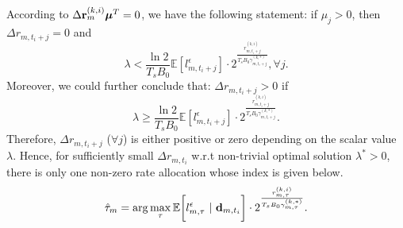 According to $\Delta{{\mathbf{r}}}^{(k,i)}_{m} \boldsymbol{\mu}^T = 0$, we have the following statement:
if $\mu_j > 0$, then $\Delta{r}_{m,t_i+j} = 0$ and
$$
\lambda < \frac{\ln{2}}{T_sB_0} \mathbb{E}[l^{\epsilon}_{m,t_i+j}] \cdot 2^{\frac{r^{(k,i)}_{m,t_i+j}}{T_sB_0 \gamma^{(k,*)}_{m,t_i+j}}}, \forall j.
$$
Moreover, we could further conclude that: $\Delta{r}_{m,t_i+j} > 0$ if
$$
\lambda \geq \frac{\ln{2}}{T_sB_0} \mathbb{E}[l^{\epsilon}_{m,t_i+j}] \cdot 2^{\frac{r^{(k,i)}_{m,t_i+j}}{T_sB_0 \gamma^{(k,*)}_{m,t_i+j}}}.
$$
Therefore, $\Delta{r}_{m,t_i+j}$ ($\forall j$) is either positive or zero depending on the scalar value $\lambda$.
Hence, for sufficiently small $\Delta{r}_{m,t_i}$ w.r.t non-trivial optimal solution $\lambda^* > 0$, there is only one non-zero rate allocation whose index is given below.
$$
\hat{\tau}_{m} = \arg\max_{\tau} \mathbb{E}\bigg[ l_{m,\tau}^{\epsilon}~|~\mathbf{d}_{m,t_i} \bigg]
                          \cdot 2^{\frac{r^{(k,i)}_{m,\tau}}{T_sB_0 \gamma^{(k,*)}_{m,\tau}}}.
$$

